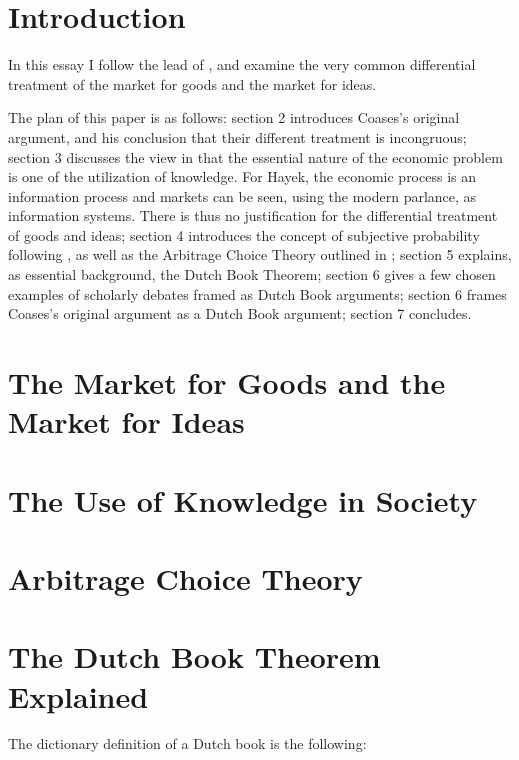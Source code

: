 \documentclass[11pt,]{article}
\begin{document}
\section{Introduction}\label{introduction}

In this essay I follow the lead of \citet{Coase1974}, and examine the
very common differential treatment of the market for goods and the
market for ideas.

The plan of this paper is as follows: section 2 introduces Coases's
original argument, and his conclusion that their different treatment is
incongruous; section 3 discusses the view in \citet{Hayek1945} that the
essential nature of the economic problem is one of the utilization of
knowledge. For Hayek, the economic process is an information process and
markets can be seen, using the modern parlance, as information systems.
There is thus no justification for the differential treatment of goods
and ideas; section 4 introduces the concept of subjective probability
following \citet{deFinetti1937}, as well as the Arbitrage Choice Theory
outlined in \citet{Nau1999}; section 5 explains, as essential
background, the Dutch Book Theorem; section 6 gives a few chosen
examples of scholarly debates framed as Dutch Book arguments; section 6
frames Coases's original argument as a Dutch Book argument; section 7
concludes.

\section{The Market for Goods and the Market for
Ideas}\label{the-market-for-goods-and-the-market-for-ideas}

\section{The Use of Knowledge in
Society}\label{the-use-of-knowledge-in-society}

\section{Arbitrage Choice Theory}\label{arbitrage-choice-theory}

\section{The Dutch Book Theorem
Explained}\label{the-dutch-book-theorem-explained}

The dictionary definition of a Dutch book is the following:
\end{document}
